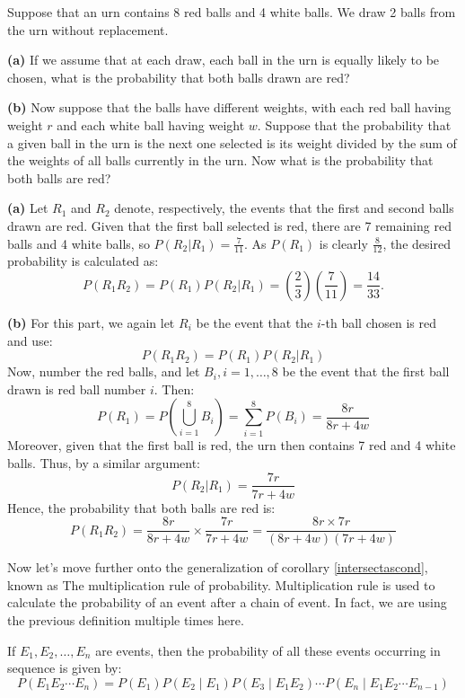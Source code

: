         \begin{example}
            Suppose that an urn contains 8 red balls and 4 white balls. We draw 2 balls from the urn without replacement.
            
            \textbf{(a)} If we assume that at each draw, each ball in the urn is equally likely to be chosen, what is the probability that both balls drawn are red?
            
            \textbf{(b)} Now suppose that the balls have different weights, with each red ball having weight \(r\) and each white ball having weight \(w\). Suppose that the probability that a given ball in the urn is the next one selected is its weight divided by the sum of the weights of all balls currently in the urn. Now what is the probability that both balls are red?
            \end{example}
            
            \begin{solution}
            \textbf{(a)} Let \( R_1 \) and \( R_2 \) denote, respectively, the events that the first and second balls drawn are red. Given that the first ball selected is red, there are 7 remaining red balls and 4 white balls, so \( P(R_2|R_1) = \frac{7}{11} \). As \( P(R_1) \) is clearly \(\frac{8}{12}\), the desired probability is calculated as:
            \[
            P(R_1 R_2) = P(R_1)P(R_2|R_1) = \left(\frac{2}{3}\right)\left(\frac{7}{11}\right) = \frac{14}{33}.
            \]
            
            \textbf{(b)} For this part, we again let \( R_i \) be the event that the \(i\)-th ball chosen is red and use:
            \[
            P(R_1 R_2) = P(R_1)P(R_2|R_1)
            \]
            Now, number the red balls, and let \( B_i, i = 1, \ldots, 8 \) be the event that the first ball drawn is red ball number \( i \). Then:
            \[
            P(R_1) = P\left(\bigcup_{i=1}^8 B_i\right) = \sum_{i=1}^8 P(B_i) = \frac{8r}{8r + 4w}
            \]
            Moreover, given that the first ball is red, the urn then contains 7 red and 4 white balls. Thus, by a similar argument:
            \[
            P(R_2|R_1) = \frac{7r}{7r + 4w}
            \]
            Hence, the probability that both balls are red is:
            \[
            P(R_1 R_2) = \frac{8r}{8r + 4w} \times \frac{7r}{7r + 4w} = \frac{8r \times 7r}{(8r + 4w)(7r + 4w)}
            \]
            \end{solution}
    
        Now let's move further onto the generalization of corollary \ref{intersectascond}, known as The multiplication rule of probability.
        Multiplication rule is used to calculate the probability of an event after a chain of event.
        In fact, we are using the previous definition multiple times here.
        \begin{theorem}
            If \(E_1, E_2, \ldots, E_n\) are events, then the probability of all these events occurring in sequence is given by:
            \[
            P(E_1 E_2 \cdots E_n) = P(E_1) P(E_2 \mid E_1) P(E_3 \mid E_1 E_2) \cdots P(E_n \mid E_1 E_2 \cdots E_{n-1})
            \]
            \end{theorem}
            
